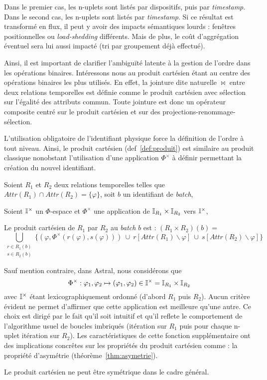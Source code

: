 \begin{example}
Dans le premier cas, les n-uplets sont listés par dispositifs, puis par \textit{timestamp}. Dans le second cas, les n-uplets sont listés par \textit{timestamp}. Si ce résultat est transformé en flux, il peut y avoir des impacts sémantiques lourds : fenêtres positionnelles ou \textit{load-shedding} différents. Mais de plus, le coût d'aggrégation éventuel sera lui aussi impacté (tri par groupement déjà effectué).
\end{example}

Ainsi, il est important de clarifier l'ambiguïté latente à la gestion de l'ordre dans les opérations binaires. Intéressons nous au produit cartésien étant au centre des opérations binaires les plus utilisés. En effet, la jointure dite naturelle $\Join$ entre deux relations temporelles est définie comme le produit cartésien avec sélection sur l'égalité des attributs commun. Toute jointure est donc un opérateur composite centré sur le produit cartésien et sur des projections-renommage-sélection.

L'utilisation obligatoire de l'identifiant physique force la définition de l'ordre à tout niveau. Ainsi, le produit cartésien (def~\ref{def:produit}) est similaire au produit classique nonobstant l'utilisation d'une application $\Phi^\times$ à définir permettant la création du nouvel identifiant.
\begin{defi}\label{def:produit}
Soient $R_1$ et $R_2$ deux relations temporelles telles que $Attr(R_1) \cap Attr(R_2) = \{\varphi\}$, soit $b$ un identifiant de \textit{batch},

Soient $\mathbb{I}^{\times}$ un $\Phi$-espace et $\Phi^\times$ une application de $\mathbb{I}_{R_1}\times\mathbb{I}_{R_2}$ vers $\mathbb{I}^\times$,

Le produit cartésien de $R_1$ par $R_2$ au \textit{batch} $b$ est : $(R_1\times R_2)(b)=$
$$\bigcup_{\begin{array}{c}  r \in R_1(b)\\ s \in R_2(b)\end{array}} \{(\varphi, \Phi^\times(r(\varphi), s(\varphi))) \ \cup \ r[Attr(R_1)\backslash \varphi]\ \cup\ s[Attr(R_2)\backslash \varphi]\}$$
\end{defi}

Sauf mention contraire, dans Astral, nous considérons que $$\Phi^\times : \varphi_1, \varphi_2 \mapsto (\varphi_1,\varphi_2)\in \mathbb{I}^\times=\mathbb{I}_{R_1}\times \mathbb{I}_{R_2}$$ avec $\mathbb{I}^\times$ étant lexicographiquement ordonné (d'abord $R_1$ puis $R_2$). Aucun critère évident ne permet d'affirmer que cette application est meilleure qu'une autre. Ce choix est dirigé par le fait qu'il soit intuitif et qu'il reflete le comportement de l'algorithme usuel de boucles imbriqués (itération sur $R_1$ puis pour chaque n-uplet itération sur $R_2$). Les caractéristiques de cette fonction supplémentaire ont des implications concrêtes sur les propriétés du produit cartésien comme : la propriété d'asymétrie (théorème~\ref{thm:asymetrie}). 
\begin{thm}\label{thm:asymetrie}
    Le produit cartésien ne peut être symétrique dans le cadre général.
\end{thm}

